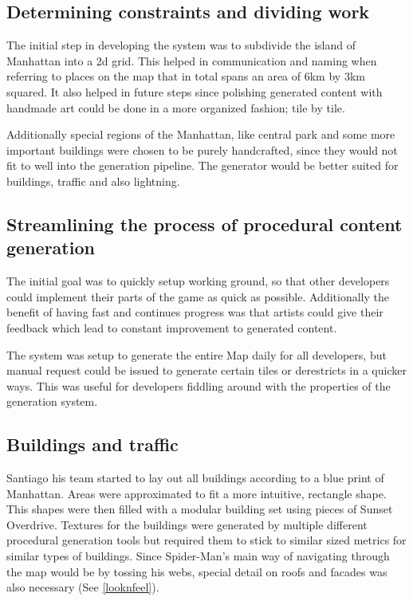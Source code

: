 \documentclass[a4paper]{article}
\begin{document}
\subsection{Determining constraints and dividing work}

The initial step in developing the system was to subdivide the island of Manhattan into a 2d grid. This helped in communication and naming when referring to places on the map that in total spans an area of 6km by 3km squared. It also helped in future steps since polishing generated content with handmade art could be done in a more organized fashion; tile by tile.

Additionally special regions of the Manhattan, like central park and some more important buildings were chosen to be purely handcrafted, since they would not fit to well into the generation pipeline. The generator would be better suited for buildings, traffic and also lightning. 

\subsection{Streamlining the process of procedural content generation}

The initial goal was to quickly setup working ground, so that other developers could implement their parts of the game as quick as possible. Additionally the benefit of having fast and continues progress was that artists could give their feedback which lead to constant improvement to generated content.

The system was setup to generate the entire Map daily for all developers, but manual request could be issued to generate certain tiles or derestricts in a quicker ways. This was useful for developers fiddling around with the properties of the generation system.

\subsection{Buildings and traffic}

Santiago his team started to lay out all buildings according to a blue print of Manhattan. Areas were approximated to fit a more intuitive, rectangle shape. This shapes were then filled with a modular building set using pieces of Sunset Overdrive. Textures for the buildings were generated by multiple different procedural generation tools but required them to stick to similar sized metrics for similar types of buildings. Since Spider-Man's main way of navigating through the map would be by tossing his webs, special detail on roofs and facades was also necessary (See \ref{looknfeel}). 
\end{document}
